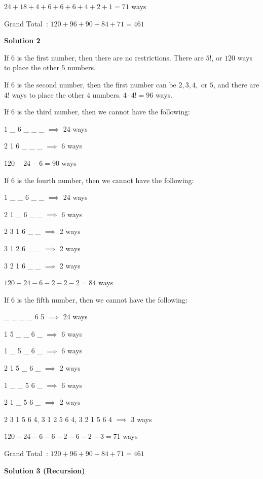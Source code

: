 \begin{enumerate}
 
$24 + 18 + 4 + 6 + 6 + 6 + 4 + 2 + 1 = 71$ ways

 
Grand Total : $120 + 96 + 90 + 84 + 71 = \boxed{461}$




\textbf{Solution 2}

If $6$ is the first number, then there are no restrictions. There are $5!$, or $120$ ways to place the other $5$ numbers.

 
If $6$ is the second number, then the first number can be $2, 3, 4,$ or $5$, and there are $4!$ ways to place the other $4$ numbers. $4 \cdot 4! = 96$ ways.

 
If $6$ is the third number, then we cannot have the following:

 1 \_ 6 \_ \_ \_ $\implies$ 24 ways

 2 1 6 \_ \_ \_ $\implies$ 6 ways

 $120 - 24 - 6 = 90$ ways

 If $6$ is the fourth number, then we cannot have the following:

 1 \_ \_ 6 \_ \_ $\implies$ 24 ways

 2 1 \_ 6 \_ \_ $\implies$ 6 ways

 2 3 1 6 \_ \_ $\implies$ 2 ways

 3 1 2 6 \_ \_ $\implies$ 2 ways

 3 2 1 6 \_ \_ $\implies$ 2 ways

 $120 - 24 - 6 - 2 - 2 - 2 = 84$ ways

 If $6$ is the fifth number, then we cannot have the following:

 \_ \_ \_ \_ 6 5 $\implies$ 24 ways

 1 5 \_ \_ 6 \_ $\implies$ 6 ways

 1 \_ 5 \_ 6 \_ $\implies$ 6 ways

 2 1 5 \_ 6 \_ $\implies$ 2 ways

 1 \_ \_ 5 6 \_ $\implies$ 6 ways

 2 1 \_ 5 6 \_ $\implies$ 2 ways

 2 3 1 5 6 4, 3 1 2 5 6 4, 3 2 1 5 6 4 $\implies$ 3 ways

 $120 - 24 - 6 - 6 - 2 - 6 - 2 - 3 = 71$ ways

 Grand Total : $120 + 96 + 90 + 84 + 71 = \boxed{461}$




\textbf{Solution 3 (Recursion)}


\end{enumerate}
